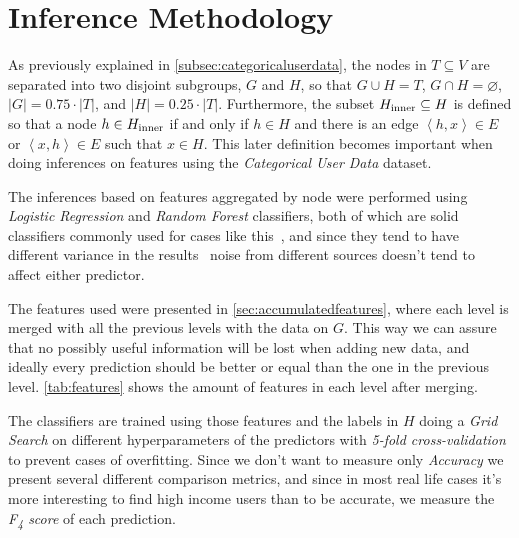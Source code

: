 

\section{Inference Methodology}
\label{sec:inference_methodology}

As previously explained in \cref{subsec:categoricaluserdata}, the nodes in $T \subseteq V$ are separated into two disjoint subgroups, $G$ and $H$, so that $G \cup H = T$, $G \cap H = \varnothing$, $\left| G \right| = 0.75 \cdot \left| T \right|$, and $\left| H \right| = 0.25 \cdot \left| T \right|$. Furthermore, the subset $H_{\operatorname{inner}} \subseteq H$ is defined so that a node $h \in H_{\operatorname{inner}}$ if and only if $h \in H$ and there is an edge $\left< h, x \right> \in E$ or $\left< x, h \right> \in E$ such that $x \in H$. %
This later definition becomes important when doing inferences on features using the \emph{Categorical User Data} dataset.


The inferences based on features aggregated by node were performed using \emph{Logistic Regression} and \emph{Random Forest} classifiers, both of which are solid classifiers commonly used for cases like this~\cite{binaryevaluation}, and since they tend to have different variance in the results~\cite{ting2016} noise from different sources doesn't tend to affect either predictor.

The features used were presented in \cref{sec:accumulatedfeatures}, where each level is merged with all the previous levels with the data on $G$. This way we can assure that no possibly useful information will be lost when adding new data, and ideally every prediction should be better or equal than the one in the previous level. \cref{tab:features} shows the amount of features in each level after merging.

The classifiers are trained using those features and the labels in $H$ doing a \emph{Grid Search} on different hyperparameters of the predictors with \emph{5-fold cross-validation} to prevent cases of overfitting. Since we don't want to measure only \emph{Accuracy} we present several different comparison metrics, and since in most real life cases it's more interesting to find high income users than to be accurate\footnotemark{}, we measure the \emph{F\textsubscript{4} score} of each prediction.



